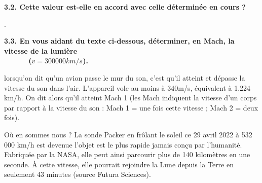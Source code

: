 \documentclass[11pt]{article}
\newcommand{\cadreblanc}[1]{%
\medskip\framebox[\linewidth][c]{%
\rule{0mm}{#1mm}}\par
\medskip}
\newcommand\SA{\marginpar{\scalebox{.8}{\framebox[1.6ex]{\rule{0ex}{1.6ex}\raisebox{.75ex}{\rule{1.6ex}{.5pt}}}\hspace{-.3pt}\framebox[3.2ex]{S}}}}
\newcommand\R{\marginpar{\scalebox{.8}{\framebox[1.6ex]{\rule{0ex}{1.6ex}\raisebox{.75ex}{\rule{1.6ex}{.5pt}}}\hspace{-.3pt}\framebox[3.2ex]{R}}}}
\newcommand\V{\marginpar{\scalebox{.8}{\framebox[1.6ex]{\rule{0ex}{1.6ex}\raisebox{.75ex}{\rule{1.6ex}{.5pt}}}\hspace{-.3pt}\framebox[3.2ex]{V}}}}
\newcommand\C{\marginpar{\scalebox{.8}{\framebox[1.6ex]{\rule{0ex}{1.6ex}\raisebox{.75ex}{\rule{1.6ex}{.5pt}}}\hspace{-.3pt}\framebox[3.2ex]{C}}}}
\begin{document}
\begin{minipage}[c]{.99\linewidth}
    \cadreblanc{25}
  \end{minipage}\R


\vfill

\textbf{3.2. Cette valeur est-elle en accord avec celle déterminée en cours ?  }\\[25pt]
\begin{minipage}[c]{.91\linewidth}
    .\dotfill\\
  \end{minipage}\V
  
\vfill

\textbf{3.3. En vous aidant du texte ci-dessous, déterminer, en Mach, la vitesse de la lumière\\
 ~~~~~~($v = 300 000 km/s$). }\\

\begin{bclogo}[logo=\bcinfo,arrondi=.1,couleur=gray!10,barre=snake,ombre = true, epOmbre = 0.15, couleurOmbre = black!30]{}
lorsqu'on dit qu'un avion passe le mur du son, c'est qu'il atteint et dépasse la vitesse du son dans l'air. L'appareil vole au moins à 340m/s, équivalent à 1.224 km/h. On dit alors qu'il atteint Mach 1 (les Mach indiquent la vitesse d'un corps par rapport à la vitesse du son : Mach 1 = une fois cette vitesse ; Mach 2 = deux fois). 
\end{bclogo}
\SA\R\C
\cadreblanc {25}

\vline 

\begin{bclogo}[logo=\bcinfo,arrondi=.1,couleur=gray!10,barre=snake,ombre = true, epOmbre = 0.15, couleurOmbre = black!30]{Où en sommes nous ? }
La sonde Packer  en frôlant le soleil ce 29 avril 2022 à 532 000 km/h est devenue l'objet est le plus rapide jamais conçu par l'humanité. Fabriquée par la NASA, elle peut ainsi parcourir plus de 140 kilomètres en une seconde. À cette vitesse, elle pourrait rejoindre la Lune depuis la Terre en seulement 43 minutes (source  Futura Sciences).
\end{bclogo}

\vline 

\newpage

\end{document}
